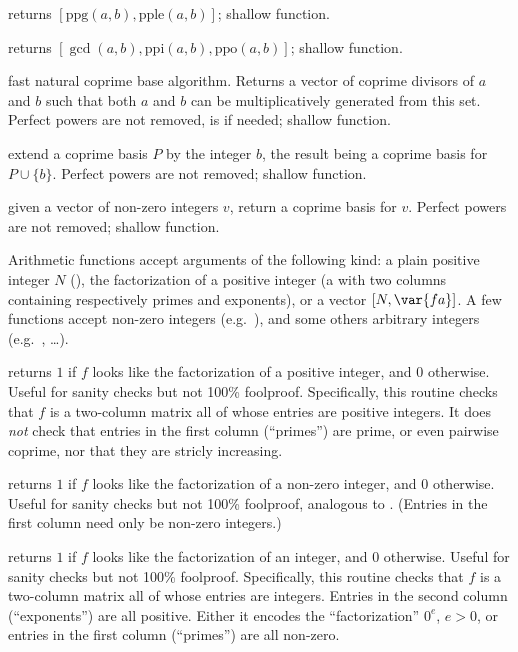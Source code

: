  returns $[\text{ppg}(a,b), \text{pple}(a,b)]$;
shallow function.

 returns
$[\gcd(a,b), \text{ppi}(a,b), \text{ppo}(a,b)]$; shallow function.

 fast natural coprime base algorithm. Returns a
vector of coprime divisors of $a$ and $b$ such that both $a$ and $b$ can
be multiplicatively generated from this set. Perfect powers are not removed,
is  if needed; shallow function.

 extend a coprime basis $P$ by the
integer $b$, the result being a coprime basis for $P\cup \{b\}$.
Perfect powers are not removed; shallow function.

 given a vector of non-zero integers $v$, return
a coprime basis for $v$. Perfect powers are not removed; shallow function.


Arithmetic functions accept arguments of the following kind: a plain positive
integer $N$ (), the factorization  of a positive integer (a
 with two columns containing respectively primes and exponents), or
a vector $[N,\var{fa}]$. A few functions accept non-zero
integers (e.g.~), and some others arbitrary integers
(e.g.~, \dots).

 returns $1$ if $f$ looks like the
factorization of a positive integer, and $0$ otherwise. Useful for sanity
checks but not 100\% foolproof. Specifically, this routine checks that $f$ is
a two-column matrix all of whose entries are positive integers. It does
\emph{not} check that entries in the first column (``primes'') are prime,
or even pairwise coprime, nor that they are stricly increasing.

 returns $1$ if $f$ looks like the
factorization of a non-zero integer, and $0$ otherwise. Useful for sanity
checks but not 100\% foolproof, analogous to . (Entries
in the first column need only be non-zero integers.)

 returns $1$ if $f$ looks like the
factorization of an integer, and $0$ otherwise. Useful for sanity
checks but not 100\% foolproof. Specifically, this routine checks that $f$ is
a two-column matrix all of whose entries are integers. Entries in the second
column (``exponents'') are all positive. Either it encodes the
``factorization'' $0^e$, $e > 0$, or entries in the first column (``primes'')
are all non-zero.

